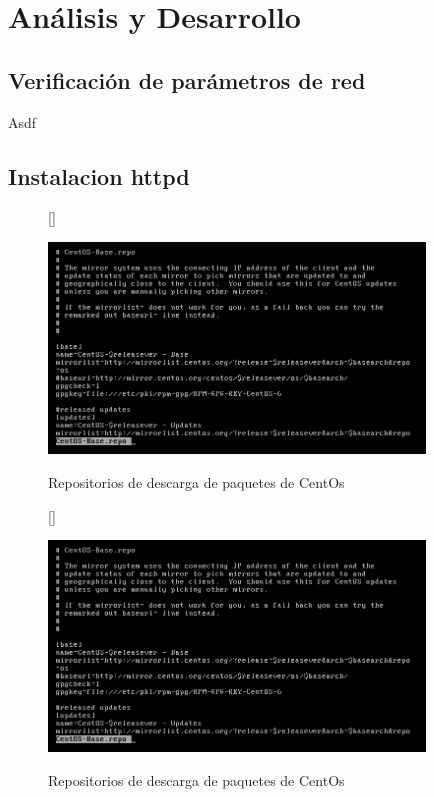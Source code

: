 \documentclass[11pt]{article}
\begin{document}
\section{Análisis y Desarrollo}
\subsection{Verificación de parámetros de red}
Asdf
\subsection{Instalacion httpd}
\begin{figure}[ht]
[\FBwidth]
{\caption{Repositorios de descarga de paquetes de CentOs}\label{fig:repositorios}}
{\includegraphics[width=10cm]{screenshots/httpd-install/repositorios-centos.png}}
\end{figure}

\begin{figure}[ht]
[\FBwidth]
{\caption{Repositorios de descarga de paquetes de CentOs}\label{fig:repositorios}}
{\includegraphics[width=10cm]{screenshots/httpd-install/repositorios-centos.png}}
\end{figure}
\end{document}
